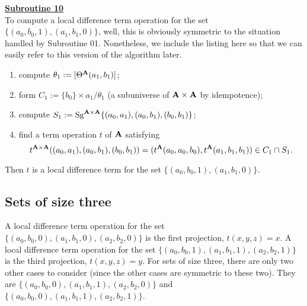 \medskip

\noindent \underline{\textbf{Subroutine 10}}\\[4pt]
To compute a local difference term operation for the set
$\{(a_0,b_0,1), (a_1, b_1, 0)\}$, well, this is obviously symmetric to
the situation handled by Subroutine 01.  Nonetheless, we include the
listing here so that we can easily refer to this version of the algorithm
later.
\begin{enumerate}
\item compute $\theta_1:=[\Theta^{\mathbf{A}}(a_1, b_1)]$;
\item form $C_1:= \{b_0\}\times a_1/\theta_1$
      (a subuniverse of $\mathbf{A}\times\mathbf{A}$ by idempotence);
\item compute
      $S_1:=\operatorname{Sg}^{\mathbf{A}\times \mathbf{A}} \{(a_0,a_1),(a_0,b_1),(b_0,b_1)\}$;
\item find a term operation $t$ of $\mathbf{A}$ satisfying
\[t^{\mathbf{A}\times\mathbf{A}}((a_0,a_1),(a_0,b_1),(b_0,b_1)) =
 (t^{\mathbf{A}}(a_0,a_0,b_0), t^{\mathbf{A}}(a_1,b_1,b_1)) \in C_1 \cap S_1.\]
\end{enumerate}
Then $t$ is a local difference term for the set
$\{(a_0, b_0, 1), (a_1, b_1, 0)\}$.

\smallskip

\subsection{Sets of size three}
A local difference term operation for the set
$\{(a_0,b_0, 0), (a_1, b_1, 0), (a_2, b_2, 0)\}$ is the first projection,
$t(x,y,z) = x$.
A local difference term operation for the set
$\{(a_0,b_0,1), (a_1, b_1, 1), (a_2, b_2, 1)\}$ is the third projection,
$t(x,y,z) = y$.
For sets of size three, there are only two other cases to consider
(since the other cases are symmetric to these two).
They are
$\{(a_0, b_0, 0), (a_1, b_1, 1),  (a_2, b_2, 0)\}$ and
$\{(a_0, b_0, 0), (a_1, b_1, 1), (a_2, b_2, 1)\}$.

\smallskip

